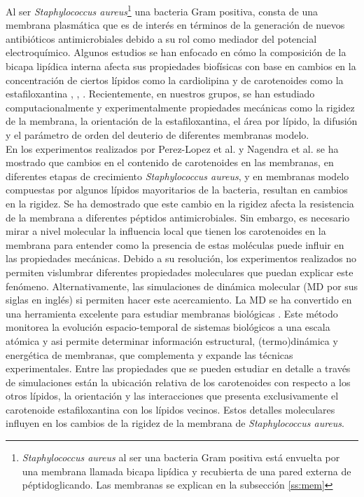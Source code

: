 Al ser \textit{Staphylococcus aureus}\footnote{\textit{Staphylococcus aureus} al ser una bacteria Gram positiva est\'{a} envuelta por una  membrana llamada bicapa lip\'{i}dica y recubierta de una pared externa de p\'{e}ptidoglicando. Las membranas se explican en la subsecci\'{o}n \ref{ss:mem}} una bacteria Gram positiva, consta de una membrana plasm\'{a}tica que es de inter\'{e}s en t\'{e}rminos de la generaci\'{o}n de nuevos antibi\'{o}ticos antimicrobiales debido a su rol como mediador del potencial electroqu\'{i}mico. Algunos estudios se han enfocado en c\'{o}mo la composici\'{o}n de la bicapa lip\'{i}dica interna afecta sus propiedades biof\'{i}sicas con base en cambios en la concentraci\'{o}n de ciertos l\'{i}pidos como la cardiolipina \cite{Hernandez-Villa1BiophysicalPeptides} y de carotenoides como la estafiloxantina \cite{Melendez-Delgado2018StudyingBilayers}, \cite{Perez-LopezVariationsProperties}, \cite{Nagendra2011}. Recientemente, en nuestros grupos, se han estudiado computacionalmente y experimentalmente propiedades mec\'{a}nicas como la rigidez de la membrana, la orientaci\'{o}n de la estafiloxantina, el \'{a}rea por l\'{i}pido, la difusi\'{o}n y el par\'{a}metro de orden del deuterio de diferentes membranas modelo.\\

En los experimentos realizados por Perez-Lopez et al. \cite{Perez-LopezVariationsProperties} y Nagendra et al.  \cite{Nagendra2011} se ha mostrado que cambios en el contenido de carotenoides en las membranas, en diferentes etapas de crecimiento \textit{Staphylococcus aureus}, y en membranas modelo compuestas por algunos l\'{i}pidos mayoritarios de la bacteria, resultan en cambios en la rigidez. Se ha demostrado que este cambio en la rigidez afecta la resistencia de la membrana a diferentes p\'{e}ptidos antimicrobiales. Sin embargo, es necesario mirar a nivel molecular la influencia local que tienen los carotenoides en la membrana para entender como la presencia de estas mol\'{e}culas puede influir en las propiedades mec\'{a}nicas. Debido a su resoluci\'{o}n, los experimentos realizados no permiten vislumbrar diferentes propiedades moleculares que puedan explicar este fen\'{o}meno. Alternativamente, las simulaciones de din\'{a}mica molecular (MD por sus siglas en ingl\'{e}s) si permiten hacer este acercamiento. La MD se ha convertido en una herramienta excelente para estudiar membranas biol\'{o}gicas \cite{Marrink2019ComputationalMembranes}. Este m\'{e}todo monitorea la evoluci\'{o}n espacio-temporal de sistemas biol\'{o}gicos a una escala at\'{o}mica y asi permite determinar informaci\'{o}n estructural, (termo)din\'{a}mica y energ\'{e}tica de membranas, que complementa y expande las t\'{e}cnicas experimentales. 
Entre las propiedades que se pueden estudiar en detalle a trav\'{e}s de simulaciones est\'{a}n la ubicaci\'{o}n relativa de los carotenoides con respecto a los otros l\'{i}pidos, la orientaci\'{o}n y las interacciones que presenta exclusivamente el carotenoide estafiloxantina con los l\'{i}pidos vecinos. Estos detalles moleculares influyen en los cambios de la rigidez de la membrana de \textit{Staphylococcus aureus}.\\

